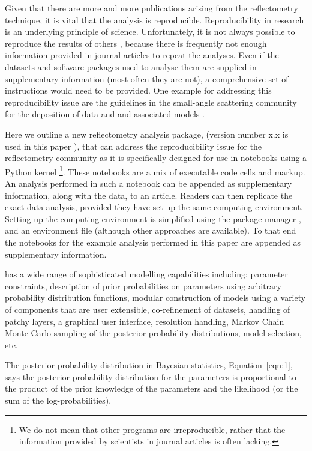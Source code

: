 \documentclass[12pt]{article}
\begin{document}
Given that there are more and more publications arising from the reflectometry technique, it is vital that the analysis is reproducible. Reproducibility in research is an underlying principle of science. Unfortunately, it is not always possible to reproduce the results of others \cite{Stark2018}, because there is frequently not enough information provided in journal articles to repeat the analyses. Even if the datasets and software packages used to analyse them are supplied in supplementary information (most often they are not), a comprehensive set of instructions would need to be provided.
One example for addressing this reproducibility issue are the guidelines in the small-angle scattering community for the deposition of data and and associated models \cite{Trewhella:jc5010}.

Here we outline a new reflectometry analysis package,  (version number x.x is used in this paper \cite{refnx}), that can address the reproducibility issue for the reflectometry community as it is specifically designed for use in \Jupyter notebooks \cite{Kluyver:2016aa} using a Python kernel \footnote{We do not mean that other programs are irreproducible, rather that the information provided by scientists in journal articles is often lacking.}.
These notebooks are a mix of executable code cells and markup. An analysis performed in such a notebook can be appended as supplementary information, along with the data, to an article. Readers can then replicate the exact data analysis, provided they have set up the same computing environment. Setting up the computing environment is simplified using the \conda package manager \cite{conda}, and an environment file (although other approaches are available). To that end the \Jupyter notebooks for the example analysis performed in this paper are appended as supplementary information.

 has a wide range of sophisticated modelling capabilities including: parameter constraints, description of prior probabilities on parameters using arbitrary probability distribution functions, modular construction of models using a variety of components that are user extensible, co-refinement of datasets, handling of patchy layers, a graphical user interface, resolution handling, Markov Chain Monte Carlo sampling of the posterior probability distributions, model selection, etc.

The posterior probability distribution in Bayesian statistics, Equation~\ref{eqn:1}, says the posterior probability distribution for the parameters is proportional to the product of the prior knowledge of the parameters and the likelihood (or the sum of the log-probabilities).
\end{document}
